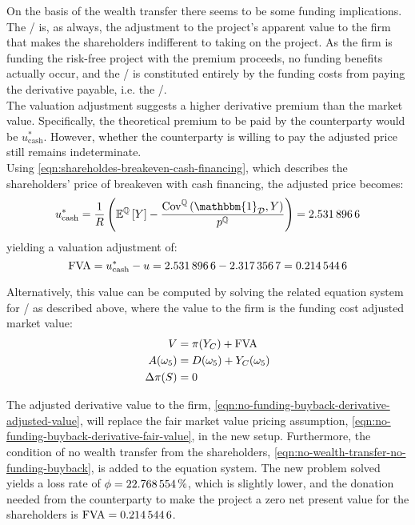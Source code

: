 \documentclass[../main.tex]{subfiles}
\begin{document}
            On the basis of the wealth transfer there seems to be some funding implications.
            The \FVA/ is, as always, the adjustment to the project's apparent value to the firm that makes the shareholders indifferent to taking on the project.
            As the firm is funding the risk-free project with the premium proceeds, no funding benefits actually occur, and the \FVA/ is constituted entirely by the funding costs from paying the derivative payable, i.e. the \FCA/.
            \\
            The valuation adjustment suggests a higher derivative premium than the market value.
            Specifically, the theoretical premium to be paid by the counterparty would be $u_{\text{cash}}^{\ast}$.
            However, whether the counterparty is willing to pay the adjusted price still remains indeterminate.
            \\
            Using \cref{eqn:shareholdes-breakeven-cash-financing}, which describes the shareholders' price of breakeven with cash financing, the adjusted price becomes:
            \begin{equation}
                u_{\text{cash}}^{\ast} = \discountfactor \left(
                    \mathbb{E}^{\rnmeasure}\left[Y\right] -
                    \frac{\text{Cov}^{\rnmeasure}\left(\mathbbm{1}_{\mathcal{D}},Y\right)}
                    {p^{\rnmeasure}}
                \right)
                = \num{2.5318966}
            \end{equation}
            yielding a valuation adjustment of:
            \begin{equation}
                \FVA/ = u_{\text{cash}}^{\ast} - u = \num{2.5318966} - \num{2.3173567} = \num{0.2145446}
            \end{equation}

            Alternatively, this value can be computed by solving the related equation system for \FCA/ as described above, where the value to the firm is the funding  cost adjusted market value:
            \begin{align}
                V &= \pi(Y_C) + \FVA/
                \label{eqn:no-funding-buyback-derivative-adjusted-value}
                \\
                A(\omega_5) &= D(\omega_5) + Y_C(\omega_5)
                \\
                \Delta \pi(S) &= 0
                \label{eqn:no-wealth-transfer-no-funding-buyback}
            \end{align}

            The adjusted derivative value to the firm, \cref{eqn:no-funding-buyback-derivative-adjusted-value},
            will replace the fair market value pricing assumption, \cref{eqn:no-funding-buyback-derivative-fair-value}, in the new setup.
            Furthermore, the condition of no wealth transfer from the shareholders, \cref{eqn:no-wealth-transfer-no-funding-buyback}, is added to the equation system.
            The new problem solved yields a loss rate of $\phi = \pct{0.22768554}$,
            which is slightly lower,
            and the donation needed from the counterparty to make the project a zero net present value for the shareholders is $\FVA/ = \num{0.2145446}$.
\end{document}

